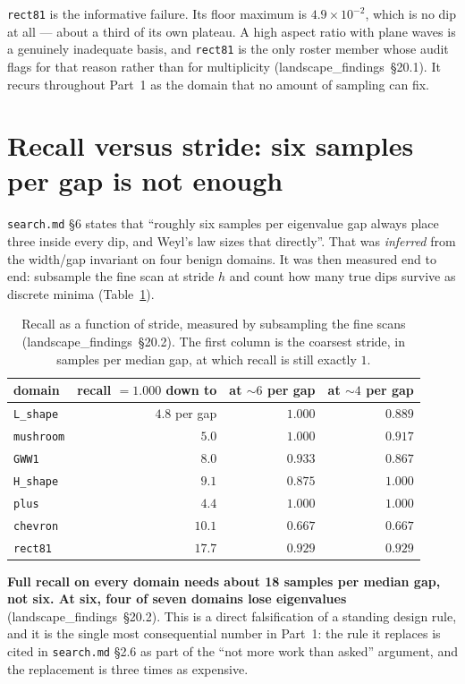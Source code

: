 \documentclass[11pt]{article}
\newcommand{\file}[1]{\texttt{#1}}
\newcommand{\lf}[1]{(landscape\_findings~\S#1)}
\begin{document}
\file{rect81} is the informative failure. Its floor maximum is $4.9\times10^{-2}$, which is no
dip at all --- about a third of its own plateau. A high aspect ratio with plane waves is a
genuinely inadequate basis, and \file{rect81} is the only roster member whose audit flags for
that reason rather than for multiplicity \lf{20.1}. It recurs throughout Part~1 as the domain
that no amount of sampling can fix.

\section{Recall versus stride: six samples per gap is not enough}
\label{sec:stride}

\file{search.md} \S6 states that ``roughly six samples per eigenvalue gap always place three
inside every dip, and Weyl's law sizes that directly''. That was \emph{inferred} from the
width/gap invariant on four benign domains. It was then measured end to end: subsample the fine
scan at stride $h$ and count how many true dips survive as discrete minima
(Table~\ref{tab:stride}).

\begin{table}[htbp]
\centering
\caption{Recall as a function of stride, measured by subsampling the fine scans \lf{20.2}.
The first column is the coarsest stride, in samples per median gap, at which recall is still
exactly $1$.}
\label{tab:stride}
\begin{tabular}{lrrr}
\toprule
domain & recall $=1.000$ down to & at $\sim6$ per gap & at $\sim4$ per gap \\
\midrule
\file{L\_shape}  & $4.8$ per gap & $1.000$ & $0.889$ \\
\file{mushroom}  & $5.0$         & $1.000$ & $0.917$ \\
\file{GWW1}      & $8.0$         & $0.933$ & $0.867$ \\
\file{H\_shape}  & $9.1$         & $0.875$ & $1.000$ \\
\file{plus}      & $4.4$         & $1.000$ & $1.000$ \\
\file{chevron}   & $10.1$        & $0.667$ & $0.667$ \\
\file{rect81}    & $17.7$        & $0.929$ & $0.929$ \\
\bottomrule
\end{tabular}
\end{table}

\textbf{Full recall on every domain needs about 18 samples per median gap, not six. At six,
four of seven domains lose eigenvalues} \lf{20.2}. This is a direct falsification of a standing
design rule, and it is the single most consequential number in Part~1: the rule it replaces is
cited in \file{search.md} \S2.6 as part of the ``not more work than asked'' argument, and the
replacement is three times as expensive.
\end{document}
